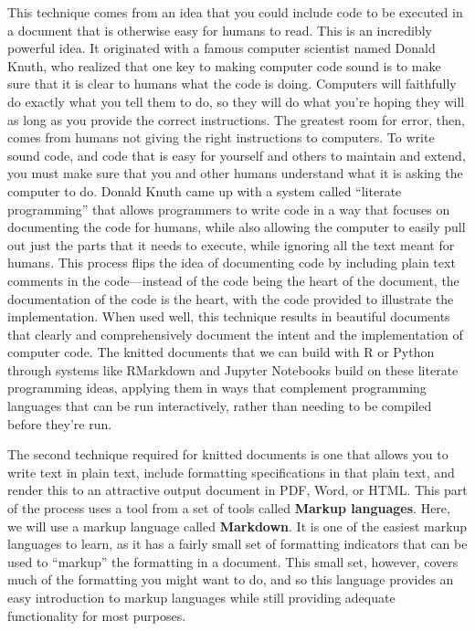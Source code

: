 \documentclass[]{tufte-book}
\begin{document}
This technique comes from an idea that you could include code to be executed in
a document that is otherwise easy for humans to read. This is an incredibly
powerful idea. It originated with a famous computer scientist named Donald
Knuth, who realized that one key to making computer code sound is to make sure
that it is clear to humans what the code is doing. Computers will faithfully do
exactly what you tell them to do, so they will do what you're hoping they will
as long as you provide the correct instructions. The greatest room for error,
then, comes from humans not giving the right instructions to computers. To
write sound code, and code that is easy for yourself and others to maintain and
extend, you must make sure that you and other humans understand what it is
asking the computer to do. Donald Knuth came up with a system called ``literate
programming'' that allows programmers to write code in a way that focuses on
documenting the code for humans, while also allowing the computer to easily
pull out just the parts that it needs to execute, while ignoring all the text
meant for humans. This process flips the idea of documenting code by including
plain text comments in the code---instead of the code being the heart of the
document, the documentation of the code is the heart, with the code provided
to illustrate the implementation. When used well, this technique results in
beautiful documents that clearly and comprehensively document the intent and
the implementation of computer code. The knitted documents that we can build
with R or Python through systems like RMarkdown and Jupyter Notebooks build
on these literate programming ideas, applying them in ways that complement
programming languages that can be run interactively, rather than needing to
be compiled before they're run.

The second technique required for knitted documents is one that allows you to
write text in plain text, include formatting specifications in that plain text,
and render this to an attractive output document in PDF, Word, or HTML. This
part of the process uses a tool from a set of tools called \textbf{Markup languages}.
Here, we will use a markup language called \textbf{Markdown}. It is one of the easiest
markup languages to learn, as it has a fairly small set of formatting indicators
that can be used to ``markup'' the formatting in a document. This small set,
however, covers much of the formatting you might want to do, and so this
language provides an easy introduction to markup languages while still providing
adequate functionality for most purposes.
\end{document}
